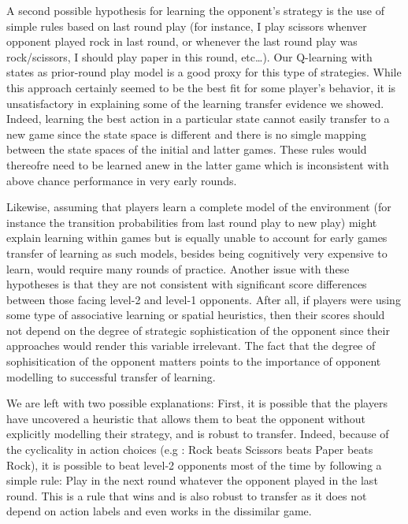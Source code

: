 \documentclass[man,floatsintext]{apa6}
\begin{document}
A second possible hypothesis for learning the opponent's strategy is the use of simple rules based on last round play (for instance, I play scissors whenver opponent played rock in last round, or whenever the last round play was rock/scissors, I should play paper in this round, etc\ldots{}). Our Q-learning with states as prior-round play model is a good proxy for this type of strategies. While this approach certainly seemed to be the best fit for some player's behavior, it is unsatisfactory in explaining some of the learning transfer evidence we showed. Indeed, learning the best action in a particular state cannot easily transfer to a new game since the state space is different and there is no simgle mapping between the state spaces of the initial and latter games. These rules would thereofre need to be learned anew in the latter game which is inconsistent with above chance performance in very early rounds.

Likewise, assuming that players learn a complete model of the environment (for instance the transition probabilities from last round play to new play) might explain learning within games but is equally unable to account for early games transfer of learning as such models, besides being cognitively very expensive to learn, would require many rounds of practice. Another issue with these hypotheses is that they are not consistent with significant score differences between those facing level-2 and level-1 opponents. After all, if players were using some type of associative learning or spatial heuristics, then their scores should not depend on the degree of strategic sophistication of the opponent since their approaches would render this variable irrelevant. The fact that the degree of sophisitication of the opponent matters points to the importance of opponent modelling to successful transfer of learning.

We are left with two possible explanations: First, it is possible that the players have uncovered a heuristic that allows them to beat the opponent without explicitly modelling their strategy, and is robust to transfer. Indeed, because of the cyclicality in action choices (e.g : Rock beats Scissors beats Paper beats Rock), it is possible to beat level-2 opponents most of the time by following a simple rule: Play in the next round whatever the opponent played in the last round. This is a rule that wins and is also robust to transfer as it does not depend on action labels and even works in the dissimilar game.
\end{document}
